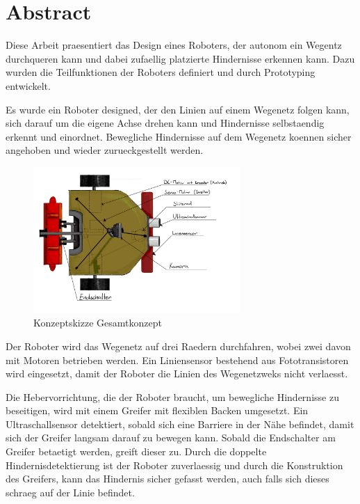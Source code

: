 \section*{Abstract}

Diese Arbeit praesentiert das Design eines Roboters, der autonom ein Wegentz durchqueren kann und dabei zufaellig platzierte Hindernisse erkennen kann. Dazu wurden die Teilfunktionen der Roboters definiert und durch Prototyping entwickelt.

Es wurde ein Roboter designed, der den Linien auf einem Wegenetz folgen kann, sich darauf um die eigene Achse drehen kann und Hindernisse selbstaendig erkennt und einordnet. Bewegliche Hindernisse auf dem Wegenetz koennen sicher angehoben und wieder zurueckgestellt werden.

\begin{figure}[H]
\centering
\includegraphics[width=0.7\textwidth]{assets/gesamtkonzept/Skizze-Fahrzeugkonzept-Beschriftet.jpg}
\caption{Konzeptskizze Gesamtkonzept}
\label{fig:robot_concept-scetch_labeld-abstract}
\end{figure}

Der Roboter wird das Wegenetz auf drei Raedern durchfahren, wobei zwei davon mit Motoren betrieben werden. Ein Liniensensor bestehend aus Fototransistoren wird eingesetzt, damit der Roboter die Linien des Wegenetzweks nicht verlaesst.

Die Hebervorrichtung, die der Roboter braucht, um bewegliche Hindernisse zu beseitigen, wird mit einem Greifer mit flexiblen Backen umgesetzt. Ein Ultraschallsensor detektiert, sobald sich eine Barriere in der Nähe befindet, damit sich der Greifer langsam darauf zu bewegen kann. Sobald die Endschalter am Greifer betaetigt werden, greift dieser zu. Durch die doppelte Hindernisdetektierung ist der Roboter zuverlaessig und durch die Konstruktion des Greifers, kann das Hindernis sicher gefasst werden, auch falls sich dieses schraeg auf der Linie befindet.

